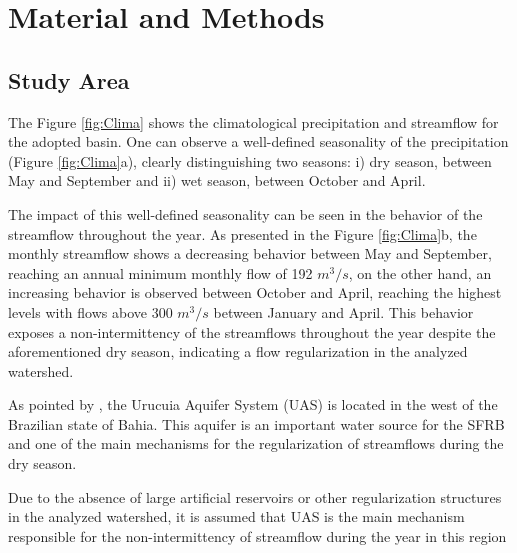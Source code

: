 \section{Material and Methods}
    \subsection{Study Area}
        The Figure \ref{fig:Clima} shows the climatological precipitation and streamflow for the adopted basin. One can observe a well-defined seasonality of the precipitation (Figure \ref{fig:Clima}a), clearly distinguishing two seasons: i) dry season, between May and September and ii) wet season, between October and April.
        
        The impact of this well-defined seasonality can be seen in the behavior of the streamflow throughout the year. As presented in the Figure \ref{fig:Clima}b, the monthly streamflow shows a decreasing behavior between May and September, reaching an annual minimum monthly flow of 192 \(m^3/s\), on the other hand, an increasing behavior is observed between October and April, reaching the highest levels with flows above 300 \(m^3/s\) between January and April. This behavior exposes a non-intermittency of the streamflows throughout the year despite the aforementioned dry season, indicating a flow regularization in the analyzed watershed.

        As pointed by \citet{Lucas2020}, the Urucuia Aquifer System (UAS) is located in the west of the Brazilian state of Bahia. This aquifer is an important water source for the SFRB and one of the main mechanisms for the regularization of streamflows during the dry season.
        
        Due to the absence of large artificial reservoirs or other regularization structures in the analyzed watershed, it is assumed that UAS is the main mechanism responsible for the non-intermittency of streamflow during the year in this region
        
